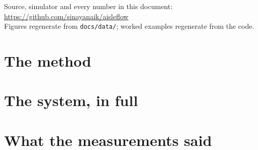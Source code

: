 \documentclass[11pt,a4paper]{article}
\begin{document}
\vfill

\begin{center}
\small
Source, simulator and every number in this document:
\url{https://github.com/sinayanaik/aisleflow}\\
Figures regenerate from \texttt{docs/data/}; worked examples regenerate from the code.
\end{center}

\clearpage
\tableofcontents
\clearpage

\part{The method}





\part{The system, in full}



















\part{What the measurements said}



\clearpage


\end{document}
